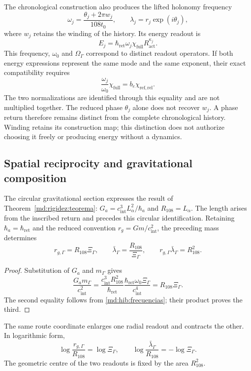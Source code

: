 The chronological construction also produces the lifted holonomy frequency
\begin{equation}
 \omega_j=\frac{\theta_j+2\pi w_j}{108t_0},\qquad
 \lambda_j=r_j\exp(i\theta_j),
 \label{md:hib:frecuencia-levantada}
\end{equation}
where $w_j$ retains the winding of the history. Its energy readout is
\begin{equation}
 E_j=\hbar_{\mathrm{ret}}\omega_j
 \chi_{\mathrm{full}}R_{\mathrm{act}}^{\kappa_j}.
 \label{md:hib:energia-levantada}
\end{equation}
This frequency, $\omega_0$ and $\Omega_\Gamma$ correspond to distinct
readout operators. If both energy expressions represent the same mode
and the same exponent, their exact compatibility requires
\begin{equation}
 \frac{\omega_j}{\omega_0}\chi_{\mathrm{full}}
 =b_e\chi_{\mathrm{ref,rel}}.
 \label{md:hib:compatibilidad-normalizaciones}
\end{equation}
The two normalizations are identified through this equality and are not
multiplied together. The reduced phase $\theta_j$ alone does not recover
$w_j$. A phase return therefore remains distinct from the complete
chronological history. Winding retains its construction map; this
distinction does not authorize choosing it freely or producing energy
without a dynamics.

\subsection{Spatial reciprocity and gravitational composition}
\label{md:hib:gravedad}

The circular gravitational section expresses the result of
Theorem~\ref{md:rigidez:teorema}:
$G_a=c_{\mathrm{int}}^3L_\alpha^2/\hbar_a$ and $R_{108}=L_\alpha$.
The length arises from the inscribed return and precedes this
circular identification. Retaining
$\hbar_a=\hbar_{\mathrm{ret}}$ and the reduced convention
$r_g=Gm/c_{\mathrm{int}}^2$, the preceding mass determines
\begin{equation}
 \boxed{r_{g,\Gamma}=R_{108}\Xi_\Gamma,\qquad
 \bar\lambda_\Gamma=\frac{R_{108}}{\Xi_\Gamma},\qquad
 r_{g,\Gamma}\bar\lambda_\Gamma=R_{108}^2.}
 \label{md:hib:reciprocidad-radial}
\end{equation}
\begin{proof}
Substitution of $G_a$ and $m_\Gamma$ gives
\[
 \frac{G_am_\Gamma}{c_{\mathrm{int}}^2}
 =\frac{c_{\mathrm{int}}^3R_{108}^2}{\hbar_{\mathrm{ret}}}
 \frac{\hbar_{\mathrm{ret}}\omega_0\Xi_\Gamma}
 {c_{\mathrm{int}}^4}
 =R_{108}\Xi_\Gamma.
\]
The second equality follows from \eqref{md:hib:frecuencias}; their
product proves the third.
\end{proof}
The same route coordinate enlarges one radial readout and contracts the
other. In logarithmic form,
\begin{equation}
 \log\frac{r_{g,\Gamma}}{R_{108}}=\log\Xi_\Gamma,
 \qquad
 \log\frac{\bar\lambda_\Gamma}{R_{108}}=-\log\Xi_\Gamma.
 \label{md:hib:radios-logaritmicos}
\end{equation}
The geometric centre of the two readouts is fixed by the area $R_{108}^2$.

